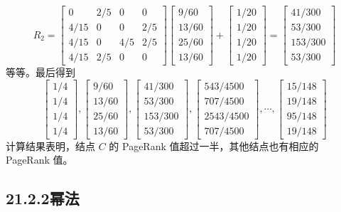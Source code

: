 \documentclass[UTF8, 12pt, fontset=fandol, oneside]{ctexart}
\begin{document}
\[
R_2=
\begin{bmatrix}
0 & 2/5 & 0 & 0\\
4/15 & 0 & 0 & 2/5\\
4/15 & 0 & 4/5 & 2/5\\
4/15 & 2/5 & 0 & 0
\end{bmatrix}
\begin{bmatrix}
9/60\\
13/60\\
25/60\\
13/60
\end{bmatrix}
+
\begin{bmatrix}
1/20\\
1/20\\
1/20\\
1/20
\end{bmatrix}
=
\begin{bmatrix}
41/300\\
53/300\\
153/300\\
53/300
\end{bmatrix}
\]
等等。最后得到
\[
\begin{bmatrix}
1/4\\
1/4\\
1/4\\
1/4
\end{bmatrix},
\begin{bmatrix}
9/60\\
13/60\\
25/60\\
13/60
\end{bmatrix},
\begin{bmatrix}
41/300\\
53/300\\
153/300\\
53/300
\end{bmatrix},
\begin{bmatrix}
543/4500\\
707/4500\\
2543/4500\\
707/4500
\end{bmatrix},
\cdots,
\begin{bmatrix}
15/148\\
19/148\\
95/148\\
19/148
\end{bmatrix}
\]
计算结果表明，结点 $C$ 的 PageRank 值超过一半，其他结点也有相应的 PageRank 值。

\subsection*{21.2.2\quad 幂法}
\end{document}
